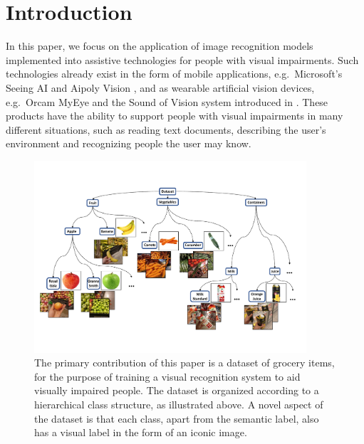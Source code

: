\section{Introduction}\label{paperA:sec:introduction}

In this paper, we focus on the application of image recognition models implemented into assistive technologies for people with visual impairments. Such technologies already exist in the form of mobile applications, e.g.~Microsoft's Seeing AI  and Aipoly Vision , and as wearable artificial vision devices, e.g.~Orcam MyEye  and the Sound of Vision system introduced in . These products have the ability to support people with visual impairments in many different situations, such as reading text documents, describing the user's environment and recognizing people the user may know. 

\begin{figure}[t]
	\centering
    \includegraphics[width=0.9\textwidth]{PaperA/figures/intro.pdf}
    \vspace{-2mm}
    \caption{The primary contribution of this paper is a dataset of grocery items, for the purpose of training a visual recognition system to aid visually impaired people. The dataset is organized according to a hierarchical class structure, as illustrated above. A novel aspect of the dataset is that each class, apart from the semantic label, also has a visual label in the form of an iconic image.}
    \label{fig:examples_paperA} 
    \vspace{-3mm}
\end{figure}

